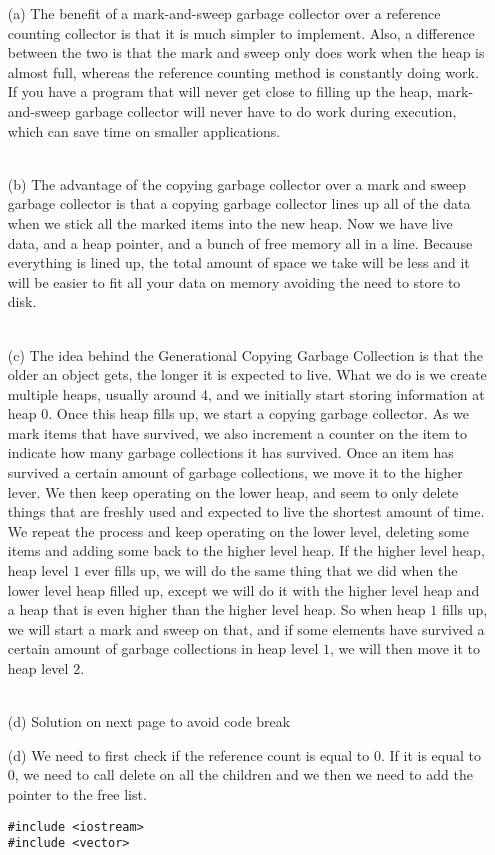\documentclass[11pt]{article}
\begin{document}
\begin{enumerate}
\begin{enumerate}
\item[(a)] The benefit of a mark-and-sweep garbage collector over a reference counting collector is that it is much simpler to implement. Also, a difference between the two is that the mark and sweep only does work when the heap is almost full, whereas the reference counting method is constantly doing work.  If you have a program that will never get close to filling up the heap, mark-and-sweep garbage collector will never have to do work during execution, which can save time on smaller applications.
\\ \\
\item[(b)] The advantage of the copying garbage collector over a mark and sweep garbage collector is that a copying garbage collector lines up all of the data when we stick all the marked items into the new heap.  Now we have live data, and a heap pointer, and a bunch of free memory all in a line.  Because everything is lined up, the total amount of space we take will be less and it will be easier to fit all your data on memory avoiding the need to store to disk.
\\ \\
\item[(c)] The idea behind the Generational Copying Garbage Collection is that the older an object gets, the longer it is expected to live.  What we do is we create multiple heaps, usually around 4, and we initially start storing information at heap $0$.  Once this heap fills up, we start a copying garbage collector.  As we mark items that have survived, we also increment a counter on the item to indicate how many garbage collections it has survived.  Once an item has survived a certain amount of garbage collections, we move it to the higher lever.  We then keep operating on the lower heap, and seem to only delete things that are freshly used and expected to live the shortest amount of time.  We repeat the process and keep operating on the lower level, deleting some items and adding some back to the higher level heap.  If the higher level heap, heap level $1$ ever fills up, we will do the same thing that we did when the lower level heap filled up, except we will do it with the higher level heap and a heap that is even higher than the higher level heap. So when heap $1$ fills up, we will start a mark and sweep on that, and if some elements have survived a certain amount of garbage collections in heap level $1$, we will then move it to heap level $2$. \\ \\
\item[(d)] Solution on next page to avoid code break
\newpage
\item[(d)] We need to first check if the reference count is equal to 0.  If it is equal to 0, we need to call delete on all the children and we then we need to add the pointer to the free list.
\\
\begin{verbatim}
#include <iostream>
#include <vector>


\end{verbatim}
\end{enumerate}
\end{enumerate}
\end{document}
